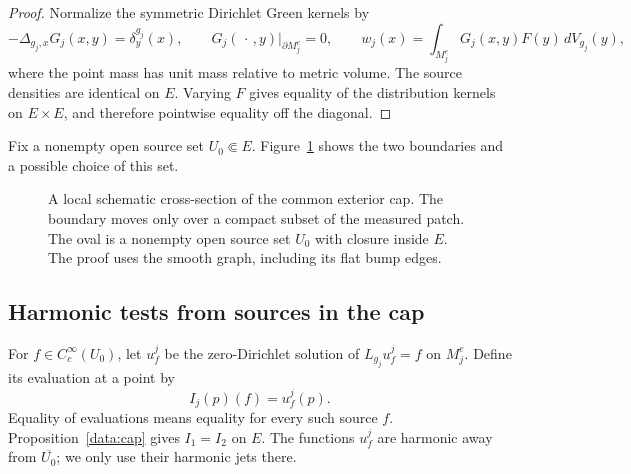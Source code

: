 \begin{proof}
Normalize the symmetric Dirichlet Green kernels by
\begin{equation}\label{data:green-normalization}
 -\Delta_{g_j,x}G_j(x,y)=\delta_y^{g_j}(x),\qquad
 G_j(\,\cdot\,,y)|_{\partial M_j^e}=0,
 \qquad
 w_j(x)=\int_{M_j^e}G_j(x,y)F(y)\,dV_{g_j}(y),
\end{equation}
where the point mass has unit mass relative to metric volume.
The source densities are identical on $E$. Varying $F$ gives
equality of the distribution kernels on $E\times E$, and therefore
pointwise equality off the diagonal.
\end{proof}

Fix a nonempty open source set $U_0\Subset E$.
Figure~\ref{data:cap-figure} shows the two boundaries and a possible
choice of this set.

\begin{figure}[htbp]
\centering
{}
\caption{A local schematic cross-section of the common exterior cap.
The boundary moves only over a compact subset of the measured patch.
The oval is a nonempty open source set $U_0$ with closure inside $E$.
The proof uses the smooth graph, including its flat bump edges.}
\label{data:cap-figure}
\end{figure}

\subsection{Harmonic tests from sources in the cap}

For $f\in C_c^\infty(U_0)$, let $u_f^j$ be the zero-Dirichlet solution
of $L_{g_j}u_f^j=f$ on $M_j^e$. Define its evaluation at a point by
\begin{equation}\label{data:evaluations}
 I_j(p)(f)=u_f^j(p).
\end{equation}
Equality of evaluations means equality for every such source $f$.
Proposition~\ref{data:cap} gives $I_1=I_2$ on $E$. The functions
$u_f^j$ are harmonic away from $\overline{U_0}$; we only use their
harmonic jets there.

